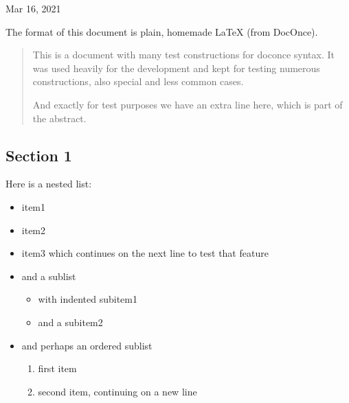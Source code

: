 \documentclass[%
oneside,                 %
final,                   %
10pt]{article}
\theoremstyle{definition}
\begin{document}

\begin{center}
Mar 16, 2021
\end{center}

\vspace{1cm}


\tableofcontents

\vspace{1cm} %


The format of this document is
plain, homemade {\LaTeX} (from DocOnce).


\begin{abstract}
This is a document with many test constructions for doconce syntax.
It was used heavily for the development and kept for testing
numerous constructions, also special and less common cases.

And exactly for test purposes we have an extra line here, which
is part of the abstract.

\end{abstract}

\subsection{Section 1}
\label{sec1}

Here is a nested list:

\begin{itemize}
  \item item1

  \item item2

  \item item3 which continues
    on the next line to test that feature

  \item and a sublist
\begin{itemize}

    \item with indented subitem1

    \item and a subitem2

\end{itemize}

\noindent
  \item and perhaps an ordered sublist
\begin{enumerate}

   \item first item

   \item second item,
      continuing on a new line
\end{enumerate}

\noindent
\end{itemize}
\end{document}
